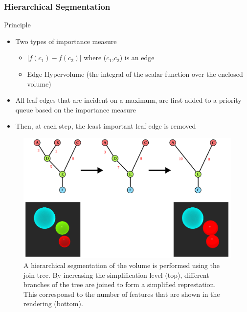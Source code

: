 \documentclass[9pt]{beamer}
\begin{document}
\begin{frame}
\frametitle{Hierarchical Segmentation}
\begin{block}{Principle}
\begin{itemize}
\item Two types of importance measure
\begin{itemize}
\item $|f(c_1)-f(c_2)|$ where ($c_1$,$c_2$) is an edge
\item Edge Hypervolume (the integral of the scalar function over the enclosed volume)
\end{itemize}
\item All leaf edges that are incident on a maximum, are first added to a priority queue based on the importance measure
\item Then, at each step, the least important leaf edge is removed
\end{itemize}
\end{block}
\begin{figure}
\includegraphics[scale=0.15]{Images/join_tree2}
\caption{A hierarchical segmentation of the volume is performed using the join tree. By increasing the simplification level (top), different branches of the tree are joined to form a simplified represtation. This corresponsd to the number of features that are shown in the rendering (bottom).}
\end{figure}
\end{frame}
\end{document}
